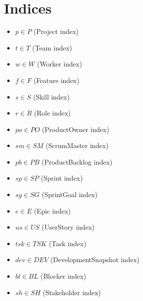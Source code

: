 \documentclass{article}
\begin{document}
\section{Indices}
\begin{itemize}
    \item $p \in P$ (Project index)
    \item $t \in T$ (Team index)
    \item $w \in W$ (Worker index)
    \item $f \in F$ (Feature index)
    \item $s \in S$ (Skill index)
    \item $r \in R$ (Role index)
    \item $po \in PO$ (ProductOwner index)
    \item $sm \in SM$ (ScrumMaster index)
    \item $pb \in PB$ (ProductBacklog index)
    \item $sp \in SP$ (Sprint index)
    \item $sg \in SG$ (SprintGoal index)
    \item $e \in E$ (Epic index)
    \item $us \in US$ (UserStory index)
    \item $tsk \in TSK$ (Task index)
    \item $dev \in DEV$ (DevelopmentSnapshot index)
    \item $bl \in BL$ (Blocker index)
    \item $sh \in SH$ (Stakeholder index)
\end{itemize}
\end{document}
